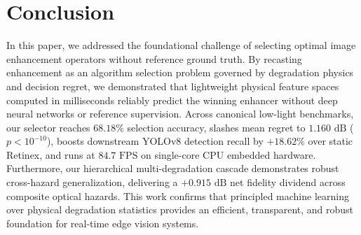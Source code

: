 \documentclass[journal]{IEEEtran}
\begin{document}
\section{Conclusion}
In this paper, we addressed the foundational challenge of selecting optimal image enhancement operators without reference ground truth. By recasting enhancement as an algorithm selection problem governed by degradation physics and decision regret, we demonstrated that lightweight physical feature spaces computed in milliseconds reliably predict the winning enhancer without deep neural networks or reference supervision. Across canonical low-light benchmarks, our selector reaches $68.18\%$ selection accuracy, slashes mean regret to $1.160\text{ dB}$ ($p < 10^{-10}$), boosts downstream YOLOv8 detection recall by $+18.62\%$ over static Retinex, and runs at $84.7\text{ FPS}$ on single-core CPU embedded hardware. Furthermore, our hierarchical multi-degradation cascade demonstrates robust cross-hazard generalization, delivering a $+0.915\text{ dB}$ net fidelity dividend across composite optical hazards. This work confirms that principled machine learning over physical degradation statistics provides an efficient, transparent, and robust foundation for real-time edge vision systems.
\end{document}

